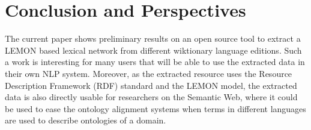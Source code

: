\documentclass[sw]{iosart2c}
\begin{document}
%
%
%
%


\section{Conclusion and Perspectives}

The current paper shows preliminary results on an open source tool to extract a LEMON based lexical network from different wiktionary language editions. Such a work is interesting for many users that will be able to use the extracted data in their own NLP system. Moreover, as the extracted resource uses the Resource Description Framework (RDF) standard and the LEMON model, the extracted data is also directly usable for researchers on the Semantic Web, where it could be used to ease the ontology alignment systems when terms in different languages are used to describe ontologies of a domain.
\end{document}
